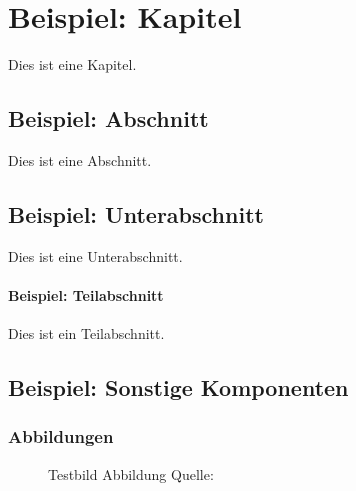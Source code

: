 \chapter{Beispiel: Kapitel}\label{chap:example}
Dies ist eine Kapitel.

\section{Beispiel: Abschnitt}\label{sec:example}
Dies ist eine Abschnitt.

\section{Beispiel: Unterabschnitt}\label{subsec:example}
Dies ist eine Unterabschnitt.

\subsubsection{Beispiel: Teilabschnitt}
Dies ist ein Teilabschnitt.

\section{Beispiel: Sonstige Komponenten}
\subsection{Abbildungen}
\begin{figure}[H]
	\centering
	\caption{Testbild Abbildung  \small{Quelle: \cite{Diefenbach.1961}}}
	\label{fig:Test}
\end{figure}

